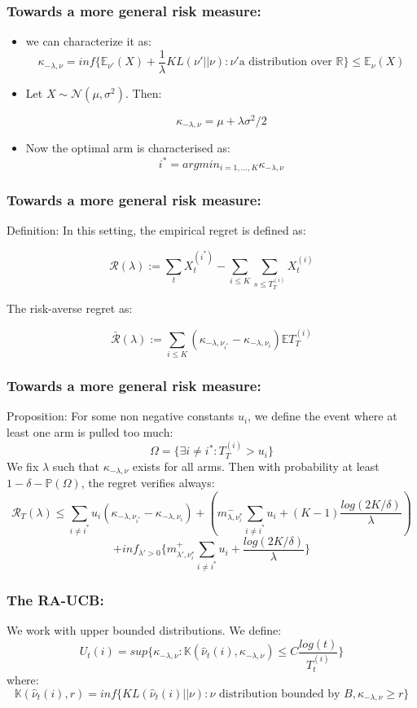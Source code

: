 \documentclass[english]{beamer}
\begin{document}
\begin{frame}
\frametitle{Towards a more general risk measure:}
\begin{itemize}
\item we can characterize it as:
$$\kappa_{-\lambda,\nu}=inf\{ \mathbb{E}_{\nu'}(X)+\frac{1}{\lambda}KL(\nu'||\nu):\nu' \text{a distribution over }\mathbb{R}\}\leq \mathbb{E}_{\nu}(X)$$
\item Let $X \sim \mathscr{N}(\mu,\sigma^2)$. Then:

$$\kappa_{-\lambda,\nu}=\mu+\lambda\sigma^2/2$$
\item Now the optimal arm is characterised as:
$$i^*=argmin_{i=1,\dots,K} \kappa_{-\lambda,\nu}$$
\end{itemize}
\end{frame}

\begin{frame}
\frametitle{Towards a more general risk measure:}

\begin{block}{Definition:}
In this setting, the empirical regret is defined as:

$$\mathscr{R}(\lambda):=\sum_{t}X_t^{(i^*)}-\sum_{i\leq K}\sum_{s\leq T_T^{(i)}}X_t^{(i)}$$

The risk-averse regret as:

$$\bar{\mathscr{R}}(\lambda):=\sum_{i\leq K}(\kappa_{-\lambda,\nu_{i^*}}-\kappa_{-\lambda,\nu_i})\mathbb{E}T_T^{(i)}$$
\end{block}
\end{frame}

\begin{frame}
\frametitle{Towards a more general risk measure:}

\begin{block}{Proposition:}
For some non negative constants $u_i$, we define the event where at least one arm is pulled too much:
$$\Omega=\{ \exists i\neq i^*: T_T^{(i)}>u_i\}$$
We fix $\lambda$ such that $\kappa_{-\lambda,\nu}$ exists for all arms. Then with probability at least $1-\delta-\mathbb{P}(\Omega)$, the regret verifies always:
$$\mathscr{R}_T(\lambda)\leq \sum_{i\neq i^*}u_i(\kappa_{-\lambda,\nu_{i^*}}-\kappa_{-\lambda,\nu_i})+
(m^-_{\lambda,\nu_i^*}\sum_{i\neq i^*}u_i+(K-1)\frac{log(2K/\delta)}{\lambda})$$$$+inf_{\lambda'>0}\{m^+_{\lambda',\nu_i^*}\sum_{i\neq i^*}u_i+\frac{log(2K/\delta)}{\lambda}\}$$
\end{block}
\end{frame}

\begin{frame}
\frametitle{The RA-UCB:}
We work with upper bounded distributions. We define:
$$U_t(i)=sup\{\kappa_{-\lambda,\nu}: \mathbb{K}(\hat{\nu}_t(i),\kappa_{-\lambda,\nu})\leq C\frac{log(t)}{T_t^{(i)}}\}$$
where:
$$\mathbb{K}(\hat{\nu}_t(i),r)=inf\{KL(\hat{\nu}_t(i)||\nu):\nu \text{ distribution bounded by } B,\kappa_{-\lambda,\nu}\geq r\}$$
\end{frame}
\end{document}
